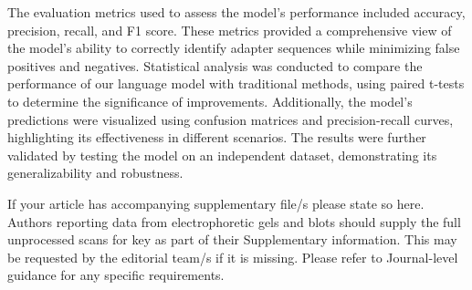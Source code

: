 \documentclass[pdflatex, sn-mathphys-num, lineno]{sn-jnl}%
\theoremstyle{thmstyleone}%
\theoremstyle{thmstyletwo}%
\theoremstyle{thmstylethree}%
\begin{document}
The evaluation metrics used to assess the model's performance included accuracy, precision, recall, and F1 score.
These metrics provided a comprehensive view of the model's ability to correctly identify adapter sequences while minimizing false positives and negatives.
Statistical analysis was conducted to compare the performance of our language model with traditional methods, using paired t-tests to determine the significance of improvements.
Additionally, the model's predictions were visualized using confusion matrices and precision-recall curves, highlighting its effectiveness in different scenarios.
The results were further validated by testing the model on an independent dataset, demonstrating its generalizability and robustness.




\backmatter


If your article has accompanying supplementary file/s please state so here.
Authors reporting data from electrophoretic gels and blots should supply the full unprocessed scans for key as part of their Supplementary information. This may be requested by the editorial team/s if it is missing.
Please refer to Journal-level guidance for any specific requirements.
\end{document}
